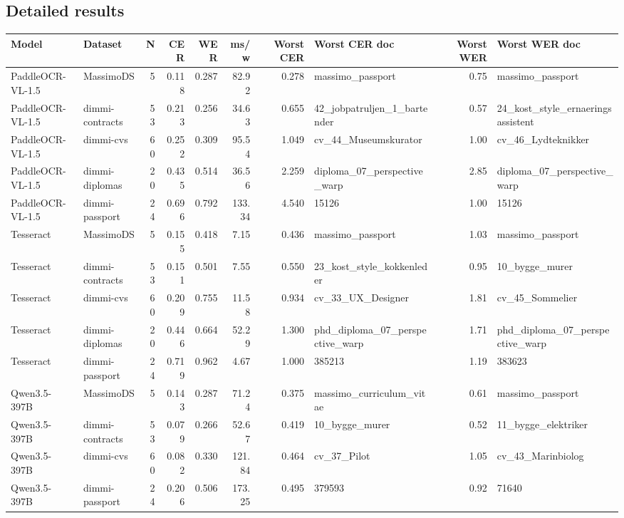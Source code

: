 \documentclass[11pt,a4paper]{article}
\begin{document}
\begin{landscape}
\subsection{Detailed results}
\begin{table}[H]
\centering
\scriptsize
\setlength{\tabcolsep}{4pt}
\begin{tabular}{llrrrrrlrl}
\toprule
\textbf{Model} & \textbf{Dataset} & \textbf{N} & \textbf{CER} & \textbf{WER} & \textbf{ms/w} & \textbf{Worst CER} & \textbf{Worst CER doc} & \textbf{Worst WER} & \textbf{Worst WER doc} \\
\midrule
PaddleOCR-VL-1.5 & MassimoDS       &  5 & 0.118 & 0.287 &  82.92 & 0.278 & massimo\_passport            & 0.75 & massimo\_passport \\
PaddleOCR-VL-1.5 & dimmi-contracts & 53 & 0.213 & 0.256 &  34.63 & 0.655 & 42\_jobpatruljen\_1\_bartender & 0.57 & 24\_kost\_style\_ernaeringsassistent \\
PaddleOCR-VL-1.5 & dimmi-cvs       & 60 & 0.252 & 0.309 &  95.54 & 1.049 & cv\_44\_Museumskurator        & 1.00 & cv\_46\_Lydteknikker \\
PaddleOCR-VL-1.5 & dimmi-diplomas  & 20 & 0.435 & 0.514 &  36.56 & 2.259 & diploma\_07\_perspective\_warp & 2.85 & diploma\_07\_perspective\_warp \\
PaddleOCR-VL-1.5 & dimmi-passport  & 24 & 0.696 & 0.792 & 133.34 & 4.540 & 15126                        & 1.00 & 15126 \\
\midrule
Tesseract & MassimoDS       &  5 & 0.155 & 0.418 &  7.15 & 0.436 & massimo\_passport               & 1.03 & massimo\_passport \\
Tesseract & dimmi-contracts & 53 & 0.151 & 0.501 &  7.55 & 0.550 & 23\_kost\_style\_kokkenleder      & 0.95 & 10\_bygge\_murer \\
Tesseract & dimmi-cvs       & 60 & 0.209 & 0.755 & 11.58 & 0.934 & cv\_33\_UX\_Designer             & 1.81 & cv\_45\_Sommelier \\
Tesseract & dimmi-diplomas  & 20 & 0.446 & 0.664 & 52.29 & 1.300 & phd\_diploma\_07\_perspective\_warp & 1.71 & phd\_diploma\_07\_perspective\_warp \\
Tesseract & dimmi-passport  & 24 & 0.719 & 0.962 &  4.67 & 1.000 & 385213                          & 1.19 & 383623 \\
\midrule
Qwen3.5-397B & MassimoDS       &  5 & 0.143 & 0.287 &  71.24 & 0.375 & massimo\_curriculum\_vitae & 0.61 & massimo\_passport \\
Qwen3.5-397B & dimmi-contracts & 53 & 0.079 & 0.266 &  52.67 & 0.419 & 10\_bygge\_murer           & 0.52 & 11\_bygge\_elektriker \\
Qwen3.5-397B & dimmi-cvs       & 60 & 0.082 & 0.330 & 121.84 & 0.464 & cv\_37\_Pilot              & 1.05 & cv\_43\_Marinbiolog \\
Qwen3.5-397B & dimmi-passport  & 24 & 0.206 & 0.506 & 173.25 & 0.495 & 379593                    & 0.92 & 71640 \\
\bottomrule
\end{tabular}
\end{table}
\end{landscape}
\end{document}
